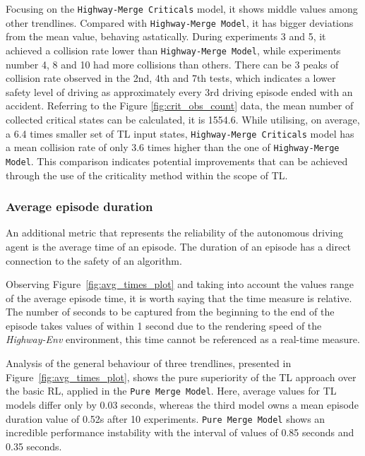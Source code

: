 Focusing on the \texttt{Highway-Merge Criticals} model, it shows middle values among other trendlines. Compared with \texttt{Highway-Merge Model}, it has bigger deviations from the mean value, behaving astatically. During experiments 3 and 5, it achieved a collision rate lower than \texttt{Highway-Merge Model}, while experiments number 4, 8 and 10 had more collisions than others. There can be 3 peaks of collision rate observed in the 2nd, 4th and 7th tests, which indicates a lower safety level of driving as approximately every 3rd driving episode ended with an accident. Referring to the Figure \ref{fig:crit_obs_count} data, the mean number of collected critical states can be calculated, it is 1554.6. While utilising, on average, a 6.4 times smaller set of TL input states, \texttt{Highway-Merge Criticals} model has a mean collision rate of only 3.6 times higher than the one of \texttt{Highway-Merge Model}. This comparison indicates potential improvements that can be achieved through the use of the criticality method within the scope of TL.

\subsubsection{Average episode duration}\label{sec:episode_time}

An additional metric that represents the reliability of the autonomous driving agent is the average time of an episode. The duration of an episode has a direct connection to the safety of an algorithm.

Observing Figure~\ref{fig:avg_times_plot} and taking into account the values range of the average episode time, it is worth saying that the time measure is relative. The number of seconds to be captured from the beginning to the end of the episode takes values of within 1 second due to the rendering speed of the \emph{Highway-Env} environment, this time cannot be referenced as a real-time measure. 

Analysis of the general behaviour of three trendlines, presented in Figure~\ref{fig:avg_times_plot}, shows the pure superiority of the TL approach over the basic RL, applied in the \texttt{Pure Merge Model}. Here, average values for TL models differ only by 0.03 seconds, whereas the third model owns a mean episode duration value of 0.52s after 10 experiments. \texttt{Pure Merge Model} shows an incredible performance instability with the interval of values of 0.85 seconds and 0.35 seconds. 

